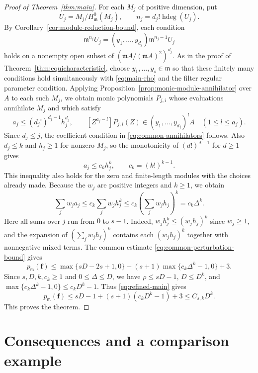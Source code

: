\documentclass[11pt,reqno]{amsart}
\numberwithin{equation}{section}
\theoremstyle{definition}
\newcommand{\m}{\mathfrak m}
\newcommand{\f}{\mathbf f}
\newcommand{\hdeg}{\operatorname{hdeg}}
\begin{document}
\begin{proof}[Proof of Theorem~\ref{thm:main}]
For each $M_j$ of positive dimension, put
\[
 U_j=M_j/H^0_{\m}(M_j),\qquad n_j=d_j!\hdeg(U_j).
\]
By Corollary~\ref{cor:module-reduction-bound}, each condition
\[
 \m^{n_j}U_j=(y_1,\ldots,y_{d_j})\m^{n_j-1}U_j
\]
holds on a nonempty open subset of $(\m A/(\m A)^2)^{d_j}$.
As in the proof of Theorem~\ref{thm:equicharacteristic}, choose
$y_1,\ldots,y_s\in\m$ so that these finitely many conditions hold
simultaneously with \eqref{eq:main-rho} and the filter regular
parameter condition.
Applying Proposition~\ref{prop:monic-module-annihilator} over $A$
to each such $M_j$, we obtain monic polynomials $P_{j,i}$ whose
evaluations annihilate $M_j$ and which satisfy
\[
 a_j\le(d_j!)^{d_j-1}h_j^{d_j},\qquad
 [Z^{a_j-l}]P_{j,i}(Z)\in(y_1,\ldots,y_{d_j})^lA
 \quad(1\le l\le a_j).
\]
Since $d_j\le j$, the coefficient condition in
\eqref{eq:common-annihilators} follows. Also $d_j\le k$ and
$h_j\ge1$ for nonzero $M_j$, so the monotonicity of
$(d!)^{d-1}$ for $d\ge1$ gives
\begin{equation}\label{eq:a-j-bound}
 a_j\le c_kh_j^k,\qquad c_k=(k!)^{k-1}.
\end{equation}
This inequality also holds for the zero and finite-length modules
with the choices already made.
Because the $w_j$ are positive integers and $k\ge1$, we obtain
\begin{equation}\label{eq:t-estimate}
 \sum_jw_ja_j\le c_k\sum_jw_jh_j^k
 \le c_k\left(\sum_jw_jh_j\right)^k
 =c_k\Delta^k.
\end{equation}
Here all sums over $j$ run from $0$ to $s-1$.
Indeed, $w_jh_j^k\le(w_jh_j)^k$ since $w_j\ge1$, and the
expansion of $(\sum_jw_jh_j)^k$ contains each $(w_jh_j)^k$
together with nonnegative mixed terms.
The common estimate \eqref{eq:common-perturbation-bound} gives
\begin{equation}\label{eq:refined-main}
 p_{\m}(\f)\le
 \max\{sD-2s+1,0\}+(s+1)\max\{c_k\Delta^k-1,0\}+3.
\end{equation}
Since $s,D,k,c_k\ge1$ and $0\le\Delta\le D$, we have
$\rho\le sD-1$, $D\le D^k$, and
$\max\{c_k\Delta^k-1,0\}\le c_kD^k-1$.
Thus \eqref{eq:refined-main} gives
\[
 p_{\m}(\f)\le sD-1+(s+1)(c_kD^k-1)+3\le C_{s,k}D^k.
\]
This proves the theorem.
\end{proof}

\section{Consequences and a comparison example}\label{sec:consequences}
\end{document}
